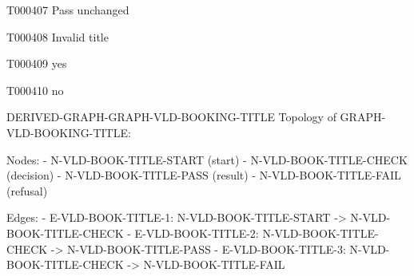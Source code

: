 \documentclass[11pt,a4paper]{article}
\begin{document}
\begin{atlastext}{T000407}
Pass unchanged
\end{atlastext}
\begin{atlastext}{T000408}
Invalid title
\end{atlastext}
\begin{atlastext}{T000409}
yes
\end{atlastext}
\begin{atlastext}{T000410}
no
\end{atlastext}
\par\noindent\begin{minipage}{\linewidth}
\begin{atlasderived}{DERIVED-GRAPH-GRAPH-VLD-BOOKING-TITLE}
Topology of GRAPH-VLD-BOOKING-TITLE:

Nodes:
- N-VLD-BOOK-TITLE-START (start)
- N-VLD-BOOK-TITLE-CHECK (decision)
- N-VLD-BOOK-TITLE-PASS (result)
- N-VLD-BOOK-TITLE-FAIL (refusal)

Edges:
- E-VLD-BOOK-TITLE-1: N-VLD-BOOK-TITLE-START -> N-VLD-BOOK-TITLE-CHECK
- E-VLD-BOOK-TITLE-2: N-VLD-BOOK-TITLE-CHECK -> N-VLD-BOOK-TITLE-PASS
- E-VLD-BOOK-TITLE-3: N-VLD-BOOK-TITLE-CHECK -> N-VLD-BOOK-TITLE-FAIL
\end{atlasderived}
\end{minipage}\par
\end{document}

